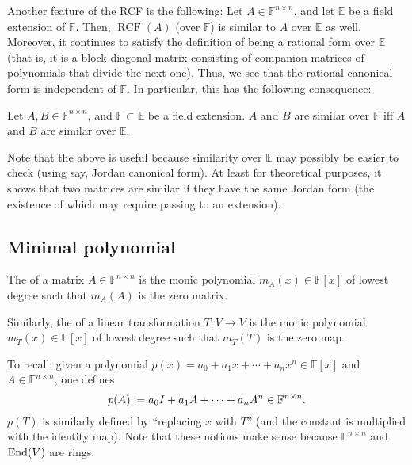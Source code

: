 \documentclass[12pt]{article}
\DeclareMathOperator{\RCF}{RCF}
\begin{document}
Another feature of the RCF is the following: Let $A \in \mathbb{F}^{n \times n}$, and let $\mathbb{E}$ be a field extension of $\mathbb{F}$. Then, $\RCF(A)$ (over $\mathbb{F}$) is similar to $A$ over $\mathbb{E}$ as well. Moreover, it continues to satisfy the definition of being a rational form over $\mathbb{E}$ (that is, it is a block diagonal matrix consisting of companion matrices of polynomials that divide the next one). Thus, we see that the rational canonical form is independent of $\mathbb{F}$. In particular, this has the following consequence:

\begin{cor}
	Let $A, B \in \mathbb{F}^{n \times n}$, and $\mathbb{F} \subset \mathbb{E}$ be a field extension. $A$ and $B$ are similar over $\mathbb{F}$ iff $A$ and $B$ are similar over $\mathbb{E}$.
\end{cor}

Note that the above is useful because similarity over $\mathbb{E}$ may possibly be easier to check (using say, Jordan canonical form). At least for theoretical purposes, it shows that two matrices are similar if they have the same Jordan form (the existence of which may require passing to an extension).

\subsection{Minimal polynomial}

\begin{defn}
	The  of a matrix $A \in \mathbb{F}^{n \times n}$ is the monic polynomial $m_{A}(x) \in \mathbb{F}[x]$ of lowest degree such that $m_{A}(A)$ is the zero matrix.

	Similarly, the  of a linear transformation $T : V \to V$ is the monic polynomial $m_{T}(x) \in \mathbb{F}[x]$ of lowest degree such that $m_{T}(T)$ is the zero map.
\end{defn}

To recall: given a polynomial $p(x) = a_{0} + a_{1} x + \cdots + a_{n} x^{n} \in \mathbb{F}[x]$ and $A \in \mathbb{F}^{n \times n}$, one defines
\begin{equation*} 
	p(A) \vcentcolon= a_{0} I + a_{1} A + \cdots + a_{n} A^{n} \in \mathbb{F}^{n \times n}.
\end{equation*}
$p(T)$ is similarly defined by ``replacing $x$ with $T$'' (and the constant is multiplied with the identity map). Note that these notions make sense because $\mathbb{F}^{n \times n}$ and $\operatorname{End}(V)$ are rings.
\end{document}
